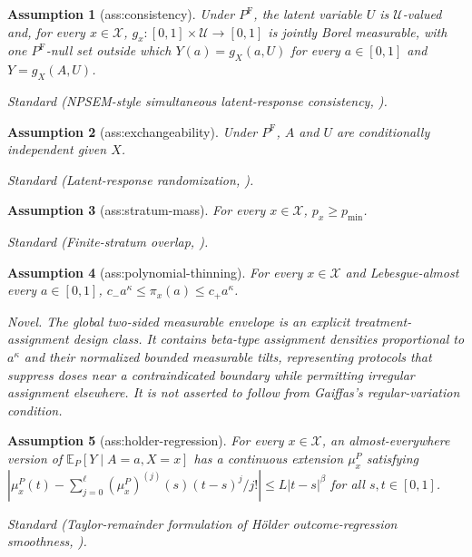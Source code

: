 \documentclass{article}
\newtheorem{assumption}{Assumption}
\begin{document}
\begin{assumption}[ass:consistency]\label{ass:consistency}
Under \(P^{\mathrm F}\), the latent variable \(U\) is \(\mathcal U\)-valued and, for every \(x\in\mathcal X\), \(g_x:[0,1]\times\mathcal U\to[0,1]\) is jointly Borel measurable, with one \(P^{\mathrm F}\)-null set outside which \(Y(a)=g_X(a,U)\) for every \(a\in[0,1]\) and \(Y=g_X(A,U)\).
\par\smallskip\noindent\emph{Standard} (NPSEM-style simultaneous latent-response consistency, \cite{DiazWilliamsHoffmanSchenck2023}).
\end{assumption}

\begin{assumption}[ass:exchangeability]\label{ass:exchangeability}
Under \(P^{\mathrm F}\), \(A\) and \(U\) are conditionally independent given \(X\).
\par\smallskip\noindent\emph{Standard} (Latent-response randomization, \cite{DiazWilliamsHoffmanSchenck2023}).
\end{assumption}

\begin{assumption}[ass:stratum-mass]\label{ass:stratum-mass}
For every \(x\in\mathcal X\), \(p_x\geq p_{\min}\).
\par\smallskip\noindent\emph{Standard} (Finite-stratum overlap, \cite{DiazWilliamsHoffmanSchenck2023}).
\end{assumption}

\begin{assumption}[ass:polynomial-thinning]\label{ass:polynomial-thinning}
For every \(x\in\mathcal X\) and Lebesgue-almost every \(a\in[0,1]\), \(c_-a^\kappa\leq\pi_x(a)\leq c_+a^\kappa\).
\par\smallskip\noindent\emph{Novel.} The global two-sided measurable envelope is an explicit treatment-assignment design class. It contains beta-type assignment densities proportional to \(a^\kappa\) and their normalized bounded measurable tilts, representing protocols that suppress doses near a contraindicated boundary while permitting irregular assignment elsewhere. It is not asserted to follow from Gaiffas's regular-variation condition.
\end{assumption}

\begin{assumption}[ass:holder-regression]\label{ass:holder-regression}
For every \(x\in\mathcal X\), an almost-everywhere version of \(\mathbb E_P[Y\mid A=a,X=x]\) has a continuous extension \(\mu_x^P\) satisfying \(\left|\mu_x^P(t)-\sum_{j=0}^{\ell}(\mu_x^P)^{(j)}(s)(t-s)^j/j!\right|\leq L|t-s|^\beta\) for all \(s,t\in[0,1]\).
\par\smallskip\noindent\emph{Standard} (Taylor-remainder formulation of Hölder outcome-regression smoothness, \cite{ArmstrongKolesar2020}).
\end{assumption}
\end{document}
